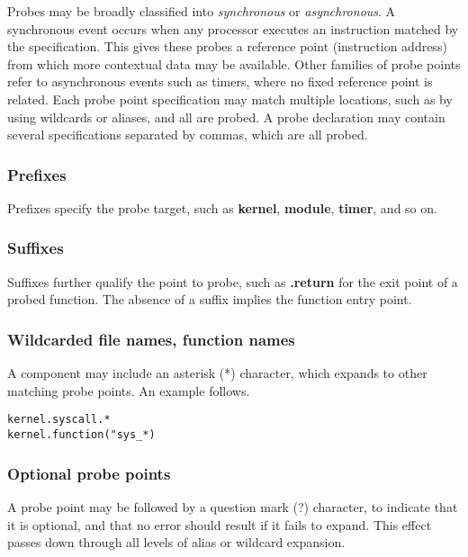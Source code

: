 \documentclass[twoside,english]{article}
\newenvironment{vindent}
{\begin{list}{}{\setlength{\listparindent}{6pt}}
\item[]}
{\end{list}}
\begin{document}
Probes may be broadly classified into \emph{synchronous}
or \emph{asynchronous}. A synchronous event occurs when
any processor executes an instruction matched by the specification. This
gives these probes a reference point (instruction address) from which more
contextual data may be available. Other families of probe points refer to
asynchronous events such as timers, where no fixed reference point is related.
Each probe point specification may match multiple locations, such as by using
wildcards or aliases, and all are probed. A probe declaration may contain
several specifications separated by commas, which are all probed.

\subsubsection{Prefixes}
Prefixes specify the probe target, such as \textbf{kernel}, \textbf{module},
\textbf{timer}, and so on.

\subsubsection{Suffixes}
Suffixes further qualify the point to probe, such as \textbf{.return} for the
exit point of a probed function. The absence of a suffix implies the function
entry point.

\subsubsection{Wildcarded file names, function names}
A component may include an asterisk ({*}) character, which expands to other
matching probe points. An example follows.

\begin{vindent}
\begin{verbatim}
kernel.syscall.*
kernel.function("sys_*)
\end{verbatim}
\end{vindent}

\subsubsection{Optional probe points\label{sub:Optional-probe-points}}
A probe point may be followed by a question mark (?) character, to indicate
that it is optional, and that no error should result if it fails to expand.
This effect passes down through all levels of alias or wildcard expansion.
\end{document}
